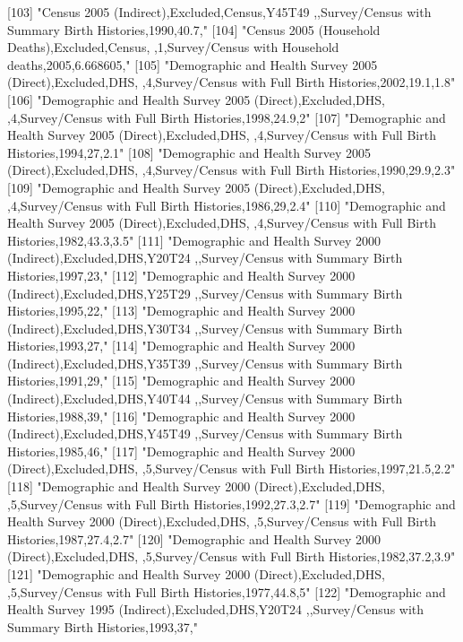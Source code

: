 [103] "Census 2005 (Indirect),Excluded,Census,Y45T49 ,,Survey/Census with Summary Birth Histories,1990,40.7,"                        
[104] "Census 2005 (Household Deaths),Excluded,Census, ,1,Survey/Census with Household deaths,2005,6.668605,"                        
[105] "Demographic and Health Survey 2005 (Direct),Excluded,DHS, ,4,Survey/Census with Full Birth Histories,2002,19.1,1.8"           
[106] "Demographic and Health Survey 2005 (Direct),Excluded,DHS, ,4,Survey/Census with Full Birth Histories,1998,24.9,2"             
[107] "Demographic and Health Survey 2005 (Direct),Excluded,DHS, ,4,Survey/Census with Full Birth Histories,1994,27,2.1"             
[108] "Demographic and Health Survey 2005 (Direct),Excluded,DHS, ,4,Survey/Census with Full Birth Histories,1990,29.9,2.3"           
[109] "Demographic and Health Survey 2005 (Direct),Excluded,DHS, ,4,Survey/Census with Full Birth Histories,1986,29,2.4"             
[110] "Demographic and Health Survey 2005 (Direct),Excluded,DHS, ,4,Survey/Census with Full Birth Histories,1982,43.3,3.5"           
[111] "Demographic and Health Survey 2000 (Indirect),Excluded,DHS,Y20T24 ,,Survey/Census with Summary Birth Histories,1997,23,"      
[112] "Demographic and Health Survey 2000 (Indirect),Excluded,DHS,Y25T29 ,,Survey/Census with Summary Birth Histories,1995,22,"      
[113] "Demographic and Health Survey 2000 (Indirect),Excluded,DHS,Y30T34 ,,Survey/Census with Summary Birth Histories,1993,27,"      
[114] "Demographic and Health Survey 2000 (Indirect),Excluded,DHS,Y35T39 ,,Survey/Census with Summary Birth Histories,1991,29,"      
[115] "Demographic and Health Survey 2000 (Indirect),Excluded,DHS,Y40T44 ,,Survey/Census with Summary Birth Histories,1988,39,"      
[116] "Demographic and Health Survey 2000 (Indirect),Excluded,DHS,Y45T49 ,,Survey/Census with Summary Birth Histories,1985,46,"      
[117] "Demographic and Health Survey 2000 (Direct),Excluded,DHS, ,5,Survey/Census with Full Birth Histories,1997,21.5,2.2"           
[118] "Demographic and Health Survey 2000 (Direct),Excluded,DHS, ,5,Survey/Census with Full Birth Histories,1992,27.3,2.7"           
[119] "Demographic and Health Survey 2000 (Direct),Excluded,DHS, ,5,Survey/Census with Full Birth Histories,1987,27.4,2.7"           
[120] "Demographic and Health Survey 2000 (Direct),Excluded,DHS, ,5,Survey/Census with Full Birth Histories,1982,37.2,3.9"           
[121] "Demographic and Health Survey 2000 (Direct),Excluded,DHS, ,5,Survey/Census with Full Birth Histories,1977,44.8,5"             
[122] "Demographic and Health Survey 1995 (Indirect),Excluded,DHS,Y20T24 ,,Survey/Census with Summary Birth Histories,1993,37,"      
